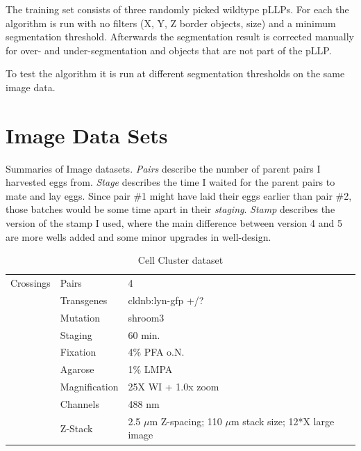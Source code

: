 \documentclass[11pt,singlespacinge,twoside]{reedthesis} %
\theoremstyle{definition}
\theoremstyle{definition}
\theoremstyle{definition}
\theoremstyle{remark}
\begin{document}
The training set consists of three randomly picked wildtype pLLPs. For each the algorithm is run with no filters (X, Y, Z border objects, size) and a minimum segmentation threshold. Afterwards the segmentation result is corrected manually for over- and under-segmentation and objects that are not part of the pLLP.

To test the algorithm it is run at different segmentation thresholds on the same image data.

\hypertarget{mat-datasets}{%
\section{Image Data Sets}\label{mat-datasets}}

Summaries of Image datasets. \emph{Pairs} describe the number of parent pairs I harvested eggs from. \emph{Stage} describes the time I waited for the parent pairs to mate and lay eggs. Since pair \#1 might have laid their eggs earlier than pair \#2, those batches would be some time apart in their \emph{staging}. \emph{Stamp} describes the version of the stamp I used, where the main difference between version 4 and 5 are more wells added and some minor upgrades in well-design.
\begin{table}[!h]

\caption{\label{tab:imgdatcc}Cell Cluster dataset}
\centering
\begin{tabu} to 
\toprule
{}  Crossings & Pairs & 4\\
 & Transgenes & cldnb:lyn-gfp +/?\\

   & Mutation & shroom3\\

 & Staging & 60 min.\\

   & Fixation & 4$\%$ PFA o.N.\\

 & Agarose & 1$\%$ LMPA\\

   & Magnification & 25X WI + 1.0x zoom\\

 & Channels & 488 nm\\

   & Z-Stack & 2.5 $\mu$m Z-spacing; 110 $\mu$m stack size; 12*X large image\\
\bottomrule
\end{tabu}
\end{table}
\end{document}
